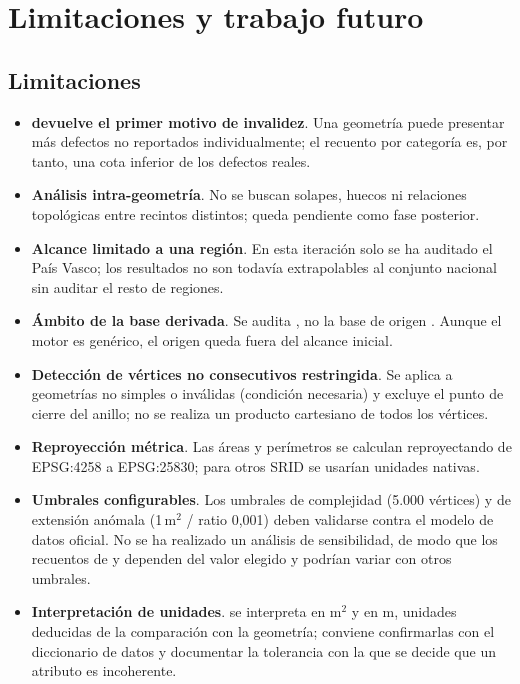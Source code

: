 \chapter{Limitaciones y trabajo futuro}
\label{ch:futuro}

\section{Limitaciones}
\label{sec:limitaciones}

\begin{itemize}[leftmargin=1.5em]
	\item \textbf{ devuelve el primer motivo de invalidez}. Una geometría puede presentar más defectos no reportados individualmente; el recuento por categoría es, por tanto, una cota inferior de los defectos reales.
	\item \textbf{Análisis intra-geometría}. No se buscan solapes, huecos ni relaciones topológicas entre recintos distintos; queda pendiente como fase posterior.
	\item \textbf{Alcance limitado a una región}. En esta iteración solo se ha auditado el País Vasco; los resultados no son todavía extrapolables al conjunto nacional sin auditar el resto de regiones.
	\item \textbf{Ámbito de la base derivada}. Se audita , no la base de origen . Aunque el motor es genérico, el origen queda fuera del alcance inicial.
	\item \textbf{Detección de vértices no consecutivos restringida}. Se aplica a geometrías no simples o inválidas (condición necesaria) y excluye el punto de cierre del anillo; no se realiza un producto cartesiano de todos los vértices.
	\item \textbf{Reproyección métrica}. Las áreas y perímetros se calculan reproyectando de EPSG:4258 a EPSG:25830; para otros SRID se usarían unidades nativas.
	\item \textbf{Umbrales configurables}. Los umbrales de complejidad (5.000 vértices) y de extensión anómala (1\,m$^{2}$ / ratio 0,001) deben validarse contra el modelo de datos oficial. No se ha realizado un análisis de sensibilidad, de modo que los recuentos de  y  dependen del valor elegido y podrían variar con otros umbrales.
	\item \textbf{Interpretación de unidades}.  se interpreta en m$^{2}$ y  en m, unidades deducidas de la comparación con la geometría; conviene confirmarlas con el diccionario de datos y documentar la tolerancia con la que se decide que un atributo es incoherente.

\end{itemize}
